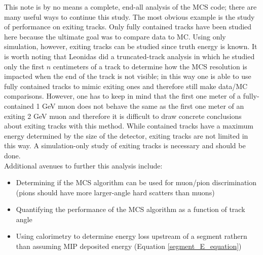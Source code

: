 This note is by no means a complete, end-all analysis of the MCS code; there are many useful ways to continue this study. The most obvious example is the study of performance on exiting tracks. Only fully contained tracks have been studied here because the ultimate goal was to compare data to MC. Using only simulation, however, exiting tracks can be studied since truth energy is known. It is worth noting that Leonidas did a truncated-track analysis\cite{leonidas1} in which he studied only the first $n$ centimeters of a track to determine how the MCS resolution is impacted when the end of the track is not visible; in this way one is able to use fully contained tracks to mimic exiting ones and therefore still make data/MC comparisons. However, one has to keep in mind that the first one meter of a fully-contained 1 GeV muon does not behave the same as the first one meter of an exiting 2 GeV muon and therefore it is difficult to draw concrete conclusions about exiting tracks with this method. While contained tracks have a maximum energy determined by the size of the detector, exiting tracks are not limited in this way. A simulation-only study of exiting tracks is necessary and should be done.\\

Additional avenues to further this analysis include:
\begin{itemize}
	\item Determining if the MCS algorithm can be used for muon/pion discrimination (pions should have more larger-angle hard scatters than muons)
	\item Quantifying the performance of the MCS algorithm as a function of track angle
	\item Using calorimetry to determine energy loss upstream of a segment rathern than assuming MIP deposited energy (Equation \ref{segment_E_equation})
\end{itemize}


